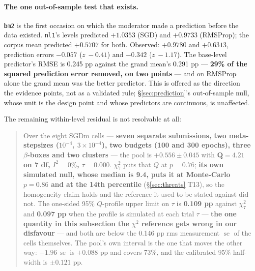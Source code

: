 \documentclass[10pt,letterpaper]{article}
\newcommand{\arm}[1]{\texttt{#1}}
\DeclareMathOperator{\se}{se}
\begin{document}
\paragraph{The one out-of-sample test that exists.}
\arm{bm2} is the first occasion on which the moderator made a prediction before the data existed.
\arm{nl1}'s levels predicted $+1.0353$ (SGD) and $+0.9733$ (RMSProp); the corpus mean predicted
$+0.5707$ for both. Observed: $+0.9780$ and $+0.6313$, prediction errors $-0.057$ ($z\ -0.41$)
and $-0.342$ ($z\ -1.17$). The base-level predictor's RMSE is 0.245 pp against the grand mean's
0.291 pp --- \textbf{29\% of the squared prediction error removed, on two points} --- and on
RMSProp alone the grand mean was the better predictor. This is offered as the direction the
evidence points, not as a validated rule; \S\ref{sec:prediction}'s out-of-sample null, whose unit
is the design point and whose predictors are continuous, is unaffected.

The remaining within-level residual is not resolvable at all:

\begin{quote}
Over the eight SGDm cells --- \textbf{seven separate submissions, two meta-stepsizes
($10^{-4}$, $3\times10^{-4}$), two budgets (100 and 300 epochs), three $\beta$-boxes and two
clusters} --- the pool is $\mathbf{+0.556 \pm 0.045}$ with $\mathbf{Q = 4.21}$ \textbf{on 7 df,
$I^2 = 0\%$, $\tau = 0.000$}. $\chi^2_7$ puts that $Q$ at $p = 0.76$; \textbf{its own simulated
null, whose median is 9.4, puts it at Monte-Carlo $p = 0.86$ and at the 14th percentile}
(\S\ref{sec:threats} T13), so the homogeneity claim holds and the reference it used to be stated
against did not. The one-sided 95\% $Q$-profile upper limit on $\tau$ is \textbf{0.109 pp}
against $\chi^2_7$ and \textbf{0.097 pp} when the profile is simulated at each trial $\tau$ ---
\textbf{the one quantity in this subsection the $\chi^2$ reference gets wrong in our
disfavour} --- and both are below the 0.146 pp rms measurement $\se$ of the cells themselves. The
pool's own interval is the one that moves the other way: $\pm 1.96\,\se$ is $\pm 0.088$ pp and
covers 73\%, and the calibrated 95\% half-width is $\pm 0.121$ pp.
\end{quote}
\end{document}
